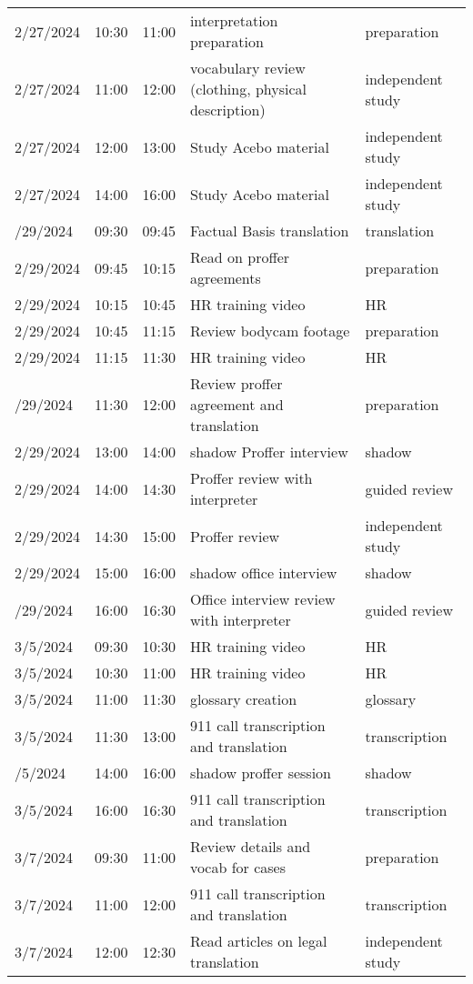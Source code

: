 \begin{table}
\begin{tabular}{lllll}
2/27/2024 & 10:30 & 11:00 & interpretation preparation & preparation\\
2/27/2024 & 11:00 & 12:00 & vocabulary review (clothing, physical description) & independent study\\
2/27/2024 & 12:00 & 13:00 & Study Acebo material & independent study\\
2/27/2024 & 14:00 & 16:00 & Study Acebo material & independent study\\
\addlinespace
2/29/2024 & 09:30 & 09:45 & Factual Basis translation & translation\\
2/29/2024 & 09:45 & 10:15 & Read on proffer agreements & preparation\\
2/29/2024 & 10:15 & 10:45 & HR training video & HR\\
2/29/2024 & 10:45 & 11:15 & Review bodycam footage & preparation\\
2/29/2024 & 11:15 & 11:30 & HR training video & HR\\
\addlinespace
2/29/2024 & 11:30 & 12:00 & Review proffer agreement and translation & preparation\\
2/29/2024 & 13:00 & 14:00 & shadow Proffer interview & shadow\\
2/29/2024 & 14:00 & 14:30 & Proffer review with interpreter & guided review\\
2/29/2024 & 14:30 & 15:00 & Proffer review & independent study\\
2/29/2024 & 15:00 & 16:00 & shadow office interview & shadow\\
\addlinespace
2/29/2024 & 16:00 & 16:30 & Office interview review with interpreter & guided review\\
3/5/2024 & 09:30 & 10:30 & HR training video & HR\\
3/5/2024 & 10:30 & 11:00 & HR training video & HR\\
3/5/2024 & 11:00 & 11:30 & glossary creation & glossary\\
3/5/2024 & 11:30 & 13:00 & 911 call transcription and translation & transcription\\
\addlinespace
3/5/2024 & 14:00 & 16:00 & shadow proffer session & shadow\\
3/5/2024 & 16:00 & 16:30 & 911 call transcription and translation & transcription\\
3/7/2024 & 09:30 & 11:00 & Review details and vocab for cases & preparation\\
3/7/2024 & 11:00 & 12:00 & 911 call transcription and translation & transcription\\
3/7/2024 & 12:00 & 12:30 & Read articles on legal translation & independent study\\

\end{tabular}
\end{table}
